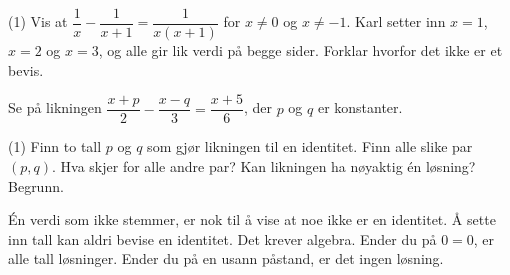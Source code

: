 
\begin{tasks}(1)
  \task Vis at $\dfrac{1}{x} - \dfrac{1}{x+1} = \dfrac{1}{x(x+1)}$ for $x \neq 0$ og $x \neq -1$.
  \task Karl setter inn $x = 1$, $x = 2$ og $x = 3$, og alle gir lik verdi på begge sider. Forklar hvorfor det ikke er et bevis.
\end{tasks}

Se på likningen $\dfrac{x+p}{2} - \dfrac{x-q}{3} = \dfrac{x+5}{6}$, der $p$ og $q$ er konstanter.
\begin{tasks}(1)
  \task Finn to tall $p$ og $q$ som gjør likningen til en identitet.
  \task Finn alle slike par $(p, q)$. Hva skjer for alle andre par?
  \task Kan likningen ha nøyaktig én løsning? Begrunn.
\end{tasks}

\begin{oppsummering}
Én verdi som ikke stemmer, er nok til å vise at noe ikke er en identitet.
Å sette inn tall kan aldri bevise en identitet. Det krever algebra.
Ender du på $0 = 0$, er alle tall løsninger. Ender du på en usann påstand, er det ingen løsning.
\end{oppsummering}
